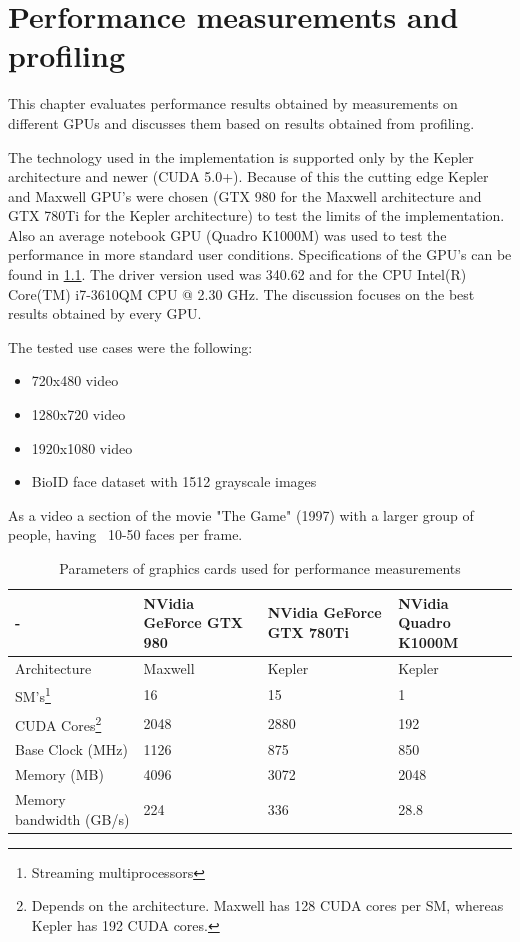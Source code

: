 \chapter{Performance measurements and profiling}

This chapter evaluates performance results obtained by measurements on different GPUs and discusses them based on results obtained from profiling.

The technology used in the implementation  is supported only by the Kepler architecture and newer (CUDA 5.0+). Because of this the cutting edge Kepler and Maxwell GPU's were chosen (GTX 980 for the Maxwell architecture and GTX 780Ti for the Kepler architecture) to test the limits of the implementation. Also an average notebook GPU (Quadro K1000M) was used to test the performance in more standard user conditions. Specifications of the GPU's can be found in \ref{tab:parameters-gpu}. The driver version used was 340.62 and for the CPU Intel(R) Core(TM) i7-3610QM CPU @ 2.30 GHz. The discussion focuses on the best results obtained by every GPU.

The tested use cases were the following:

\begin{itemize}
	\item 720x480 video
	\item 1280x720 video
	\item 1920x1080 video
	\item BioID face dataset with 1512 grayscale images
\end{itemize}

As a video a section of the movie "The Game" (1997) with a larger group of people, having ~10-50 faces per frame.

\begin{center}
\begin{table}[htbp]
\begin{tabularx}{\textwidth}{| X | X | X | X |}
\hline
- & NVidia GeForce GTX 980 & NVidia GeForce GTX 780Ti & NVidia Quadro K1000M \\
\hline
Architecture & Maxwell & Kepler & Kepler \\
\hline
SM's\footnote{Streaming multiprocessors} & 16 & 15 & 1 \\
\hline
CUDA Cores\footnote{Depends on the architecture. Maxwell has 128 CUDA cores per SM, whereas Kepler has 192 CUDA cores.} & 2048 & 2880 & 192 \\
\hline
Base Clock (MHz) & 1126 & 875 & 850 \\
\hline
Memory (MB) & 4096 & 3072 & 2048 \\
\hline
Memory bandwidth (GB/s) & 224 & 336 & 28.8 \\
\hline
\end{tabularx}
\caption{Parameters of graphics cards used for performance measurements}
\label{tab:parameters-gpu}
\end{table}
\end{center}

